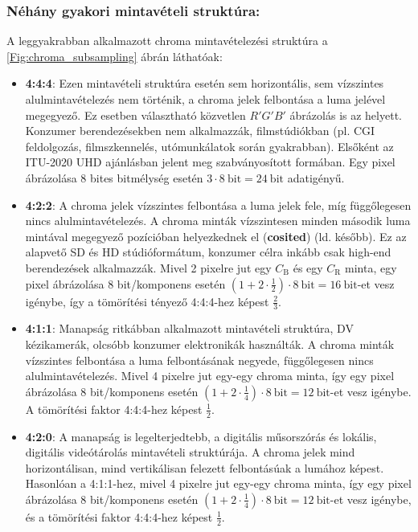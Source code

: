 \subsubsection*{Néhány gyakori mintavételi struktúra:\\}

A leggyakrabban alkalmazott chroma mintavételezési struktúra a \ref{Fig:chroma_subsampling} ábrán láthatóak:
\begin{itemize}
\item \textbf{4:4:4}: Ezen mintavételi struktúra esetén sem horizontális, sem vízszintes alulmintavételezés nem történik, a chroma jelek felbontása a luma jelével megegyező.
Ez esetben választható közvetlen $R'G'B'$ ábrázolás is az \ycbcr helyett.
Konzumer berendezésekben nem alkalmazzák, filmstúdiókban (pl. CGI feldolgozás, filmszkennelés, utómunkálatok során gyakrabban).
Elsőként az ITU-2020 UHD ajánlásban jelent meg szabványosított formában.
Egy pixel ábrázolása 8 bites bitmélység esetén $3 \cdot 8 ~\mathrm{bit} = 24~\mathrm{bit}$ adatigényű.
%
\item \textbf{4:2:2}: A chroma jelek vízszintes felbontása a luma jelek fele, míg függőlegesen nincs alulmintavételezés.
A chroma minták vízszintesen minden második luma mintával megegyező pozícióban helyezkednek el (\textbf{cosited}) (ld. később).
Ez az alapvető SD és HD stúdióformátum, konzumer célra inkább csak high-end berendezések alkalmazzák.
Mivel 2 pixelre jut egy $C_{\mathrm{B}}$ és egy $C_{\mathrm{R}}$ minta, egy pixel ábrázolása 8 bit/komponens esetén $(1+ 2\cdot \frac{1}{2})\cdot 8~\mathrm{bit} = 16~\mathrm{bit}$-et vesz igénybe, így a tömörítési tényező 4:4:4-hez képest $\frac{2}{3}$.
%
\item \textbf{4:1:1}: Manapság ritkábban alkalmazott mintavételi struktúra, DV kézikamerák, olcsóbb konzumer elektronikák használták.
A chroma minták vízszintes felbontása a luma felbontásának negyede, függőlegesen nincs alulmintavételezés.
Mivel 4 pixelre jut egy-egy chroma minta, így egy pixel ábrázolása 8 bit/komponens esetén $(1+ 2\cdot \frac{1}{4})\cdot 8~\mathrm{bit} = 12~\mathrm{bit}$-et vesz igénybe. 
A tömörítési faktor 4:4:4-hez képest $\frac{1}{2}$.
%
\item \textbf{4:2:0}: A manapság is legelterjedtebb, a digitális műsorszórás és lokális, digitális videótárolás mintavételi struktúrája.
A chroma jelek mind horizontálisan, mind vertikálisan felezett felbontásúak a lumához képest.
Hasonlóan a 4:1:1-hez, mivel 4 pixelre jut egy-egy chroma minta, így egy pixel ábrázolása 8 bit/komponens esetén $(1+ 2\cdot \frac{1}{4})\cdot 8~\mathrm{bit} = 12~\mathrm{bit}$-et vesz igénybe, és a tömörítési faktor 4:4:4-hez képest $\frac{1}{2}$.


\end{itemize}
